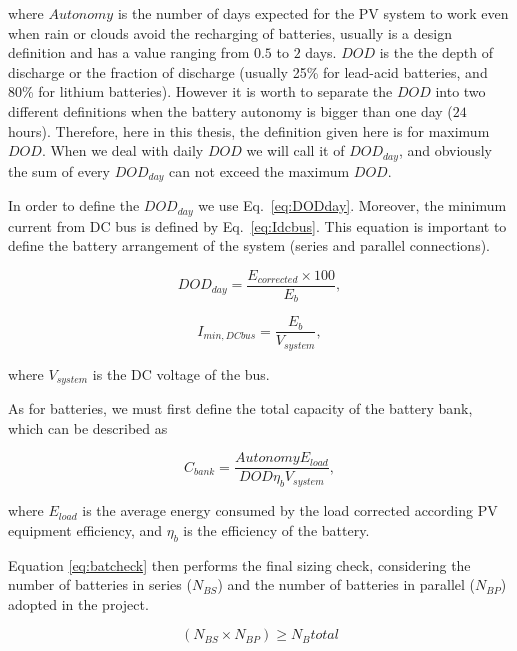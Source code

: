 \documentclass[runningheads]{llncs}
\begin{document}
\noindent where $Autonomy$ is the number of days expected for the PV system to work even when rain or clouds avoid the recharging of batteries, usually is a design definition and has a value ranging from $0.5$ to $2$ days. $DOD$ is the 
the depth of discharge or the fraction of discharge (usually 25\% for lead-acid batteries, and 80\% for lithium batteries). However it is worth to separate the $DOD$ into two different definitions when the battery autonomy is bigger than one day ($24$ hours). Therefore, here in this thesis, the definition given here is for maximum $DOD$. When we deal with daily $DOD$ we will call it of $DOD_{day}$, and obviously the sum of every $DOD_{day}$ can not exceed the maximum $DOD$.

In order to define the $DOD_{day}$ we use Eq.~\eqref{eq:DODday}. Moreover, the minimum current from DC bus is defined by Eq.~\eqref{eq:Idcbus}. This equation is important to define the battery arrangement of the system (series and parallel connections).

\begin{equation}
\label{eq:DODday}
DOD_{day} = \dfrac{E_{corrected} \times 100}{E_{b}},
\end{equation}

\begin{equation}
\label{eq:Idcbus}
I_{min,DCbus} = \dfrac{E_{b}}{V_{system}},
\end{equation}

\noindent where $V_{system}$ is the DC voltage of the bus. 

As for batteries, we must first define the total capacity of the battery bank, which can be described as

\begin{equation}
\label{eq:Cbank}
C_{bank} = \dfrac{Autonomy E_{load}}{DOD \eta _{b} V_{system}},
\end{equation}

\noindent where $ E_{load} $ is the average energy consumed by the load corrected according PV equipment efficiency, and $ \eta_{b} $ is the efficiency of the battery.

Equation \ref{eq:batcheck} then performs the final sizing check, considering the number of batteries in series ($ N_{BS} $) and the number of batteries in parallel ($ N_{BP} $) adopted in the project.

\begin{equation}
\label{eq:batcheck}
\left( N_{BS} \times N_{BP} \right) \geq N_{B}total
\end{equation}
\end{document}
